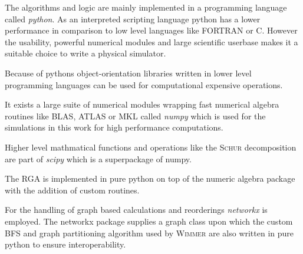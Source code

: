 The algorithms and logic are mainly implemented in a programming language called \emph{python}. As an interpreted scripting language python has a lower performance in comparison to low level languages like FORTRAN or C. However the usability, powerful numerical modules and large scientific userbase makes it a suitable choice to write a physical simulator.\par
Because of pythons object-orientation libraries written in lower level programming languages can be used for computational expensive operations.\par
It exists a large suite of numerical modules wrapping fast numerical algebra routines like BLAS, ATLAS or MKL called \emph{numpy} \cite{numpy} which is used for the simulations in this work for high performance computations.\par
Higher level mathmatical functions and operations like the \textsc{Schur} decomposition are part of \emph{scipy} \cite{scipy} which is a superpackage of numpy.\par
The RGA is implemented in pure python on top of the numeric algebra package with the addition of custom routines.\par
For the handling of graph based calculations and reorderings \emph{networkx} \cite{networkx} is employed. The networkx package supplies a graph class upon which the custom BFS and graph partitioning algorithm used by \textsc{Wimmer} are also written in pure python to ensure interoperability.
